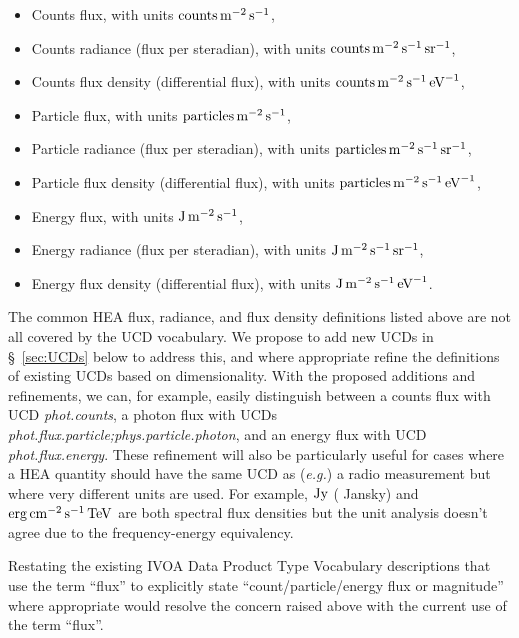 \documentclass[11pt,a4paper]{ivoa}
\begin{document}
\begin{itemize}
\item Counts flux, with units $\rm\hbox{counts}\,m^{-2}\,s^{-1}$,
\item Counts radiance (flux per steradian), with units $\rm\hbox{counts}\,m^{-2}\,s^{-1}\,\hbox{sr}^{-1}$,
\item Counts flux density (differential flux), with units $\rm\hbox{counts}\,m^{-2}\,s^{-1}\,\hbox{eV}^{-1}$,
\item Particle flux, with units $\rm\hbox{particles}\,m^{-2}\,s^{-1}$,
\item Particle radiance (flux per steradian), with units $\rm\hbox{particles}\,m^{-2}\,s^{-1}\,\hbox{sr}^{-1}$,
\item Particle flux density (differential flux), with units $\rm\hbox{particles}\,m^{-2}\,s^{-1}\,\hbox{eV}^{-1}$,
\item Energy flux, with units $\rm J\,m^{-2}\,s^{-1}$,
\item Energy radiance (flux per steradian), with units $\rm J\,m^{-2}\,s^{-1}\,\hbox{sr}^{-1}$,
\item Energy flux density (differential flux), with units $\rm J\,m^{-2}\,s^{-1}\,\hbox{eV}^{-1}$.
\end{itemize}

The common \gls{HEA} flux, radiance, and flux density definitions listed above are not all covered by the UCD vocabulary.   We propose to add new UCDs in \S~\ref{sec:UCDs} below to address this, and where appropriate refine the definitions of existing UCDs based on dimensionality.  With the proposed additions and refinements, we can, for example, easily distinguish between a counts flux with UCD {\em phot.counts\/}, a photon flux with UCDs {\em phot.flux.particle;phys.particle.photon\/}, and an energy flux with UCD {\em phot.\-flux.energy\/}.  These refinement will also be particularly useful for cases where a \gls{HEA} quantity should have the same UCD as ({\em e.g.\/}) a radio measurement but where very different units are used. For example, $\rm Jy$ ( Jansky) and $\rm erg\,cm^{-2}\,s^{-1}\,TeV$ are both spectral flux densities but the unit analysis doesn’t agree due to the frequency-energy equivalency.

Restating the existing IVOA Data Product Type Vocabulary descriptions that use the term ``flux'' to explicitly state ``count/particle/energy flux or magnitude'' where appropriate would resolve the concern raised above with the current use of the term ``flux''.
\end{document}
